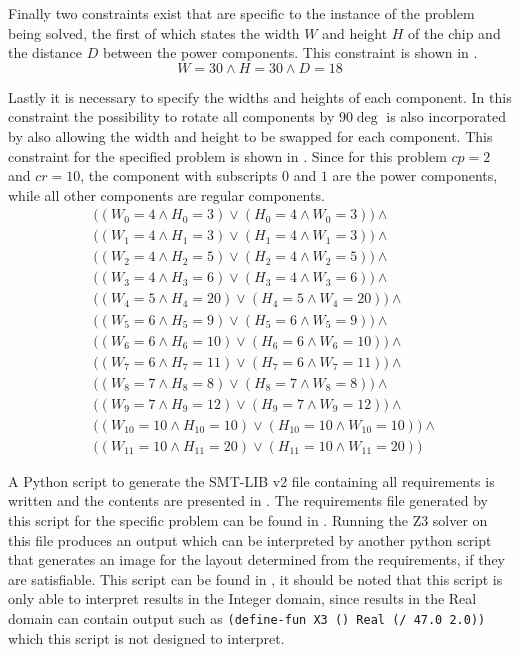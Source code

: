 Finally two constraints exist that are specific to the instance of the problem being solved, the first of which states the width $W$ and height $H$ of the chip and the distance $D$ between the power components. This constraint is shown in .
\begin{equation}
  \label{eqn:2_whd}
  W = 30 \wedge H = 30 \wedge D = 18
\end{equation}

Lastly it is necessary to specify the widths and heights of each component. In this constraint the possibility to rotate all components by $90\deg$ is also incorporated by also allowing the width and height to be swapped for each component. This constraint for the specified problem is shown in . Since for this problem $cp = 2$ and $cr = 10$, the component with subscripts $0$ and $1$ are the power components, while all other components are regular components.
\newcommand{\IIsize}[3]{
  &\Big(
    (W_{#1} = #2 \wedge H_{#1} = #3) \vee
    (H_{#1} = #2 \wedge W_{#1} = #3)
  \Big)
}
\begin{equation}
  \label{eqn:2_sizes}
  \begin{aligned}
    \IIsize{0} {4} {3}  \wedge \\
    \IIsize{1} {4} {3}  \wedge \\
    \IIsize{2} {4} {5}  \wedge \\
    \IIsize{3} {4} {6}  \wedge \\
    \IIsize{4} {5} {20} \wedge \\
    \IIsize{5} {6} {9}  \wedge \\
    \IIsize{6} {6} {10} \wedge \\
    \IIsize{7} {6} {11} \wedge \\
    \IIsize{8} {7} {8}  \wedge \\
    \IIsize{9} {7} {12} \wedge \\
    \IIsize{10}{10}{10} \wedge \\
    \IIsize{11}{10}{20}
  \end{aligned}
\end{equation}

A Python script to generate the SMT-LIB v2 file containing all requirements is written and the contents are presented in . The requirements file generated by this script for the specific problem can be found in . Running the Z3 solver on this file produces an output which can be interpreted by another python script that generates an image for the layout determined from the requirements, if they are satisfiable. This script can be found in , it should be noted that this script is only able to interpret results in the Integer domain, since results in the Real domain can contain output such as \texttt{(define-fun X3 () Real (/ 47.0 2.0))} which this script is not designed to interpret.


